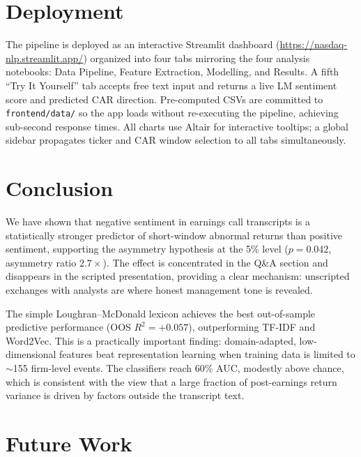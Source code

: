 \documentclass[conference]{IEEEtran}
\begin{document}
\section{Deployment}
\label{sec:deployment}

The pipeline is deployed as an interactive Streamlit dashboard
(\url{https://nasdaq-nlp.streamlit.app/})
organized into four tabs mirroring the four analysis notebooks:
Data Pipeline, Feature Extraction, Modelling, and Results.
A fifth ``Try It Yourself'' tab accepts free text input and returns
a live LM sentiment score and predicted CAR direction.
Pre-computed CSVs are committed to \texttt{frontend/data/} so the app
loads without re-executing the pipeline, achieving sub-second response times.
All charts use Altair for interactive tooltips; a global sidebar propagates
ticker and CAR window selection to all tabs simultaneously.

\section{Conclusion}
\label{sec:conclusion}

We have shown that negative sentiment in earnings call transcripts is a
statistically stronger predictor of short-window abnormal returns than positive
sentiment, supporting the asymmetry hypothesis at the 5\% level
($p = 0.042$, asymmetry ratio $2.7\times$). The effect is concentrated in the
Q\&A section and disappears in the scripted presentation, providing a clear
mechanism: unscripted exchanges with analysts are where honest management tone
is revealed.

The simple Loughran--McDonald lexicon achieves the best out-of-sample predictive
performance (OOS $R^2 = +0.057$), outperforming TF-IDF and Word2Vec.
This is a practically important finding: domain-adapted, low-dimensional features
beat representation learning when training data is limited to $\sim$155 firm-level
events. The classifiers reach 60\% AUC, modestly above chance, which is
consistent with the view that a large fraction of post-earnings return variance is
driven by factors outside the transcript text.

\section{Future Work}
\label{sec:futurework}
\end{document}
